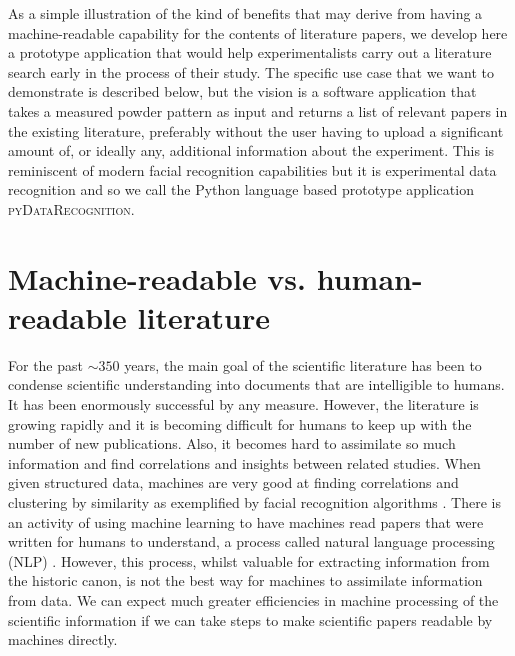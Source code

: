 \documentclass[preprint]{iucr}
\newcommand{\pydr}{\textsc{pyDataRecognition}\xspace}
\begin{document}
As a simple illustration of the kind of benefits that may derive from having a machine-readable capability for the contents of literature papers, we develop here a prototype application that would help experimentalists carry out a literature search early in the process of their study.  The specific use case that we want to demonstrate is described below, but the vision is a software  application that takes a measured powder pattern as input and returns a list of relevant papers in the existing literature, preferably without the user having to upload a significant amount of, or ideally any, additional information about the experiment. This is reminiscent of modern facial recognition capabilities but it is experimental data recognition and so we call the Python language based prototype application \pydr.


\section{Machine-readable vs. human-readable literature}

For the past $\sim 350$   years, the main goal of the scientific literature has been to condense scientific understanding into documents that are intelligible to humans.  It has been enormously successful by any measure.  However, the literature is growing rapidly and it is becoming difficult for humans to keep up with the number of new publications.  Also, it becomes hard to assimilate so much information and find correlations and insights between related studies.  When given structured data, machines are very good at finding correlations and clustering by similarity as exemplified by facial recognition algorithms \cite{anwarulComprehensiveReviewFace2020}.  There is an activity of using machine learning to have machines read papers that were written for humans to understand, a process called natural language processing (NLP) \cite{chowdharyNaturalLanguageProcessing2020}.  However, this process, whilst valuable for extracting information from the historic canon, is not the best way for machines to assimilate information from data.  We can expect much greater efficiencies in machine processing of the scientific information if we can take steps to make scientific papers readable by machines directly.
\end{document}
